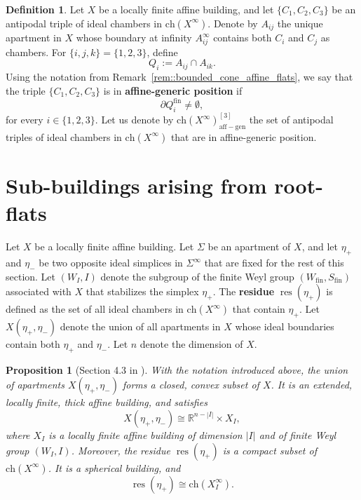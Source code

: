 \documentclass[11pt]{amsart}
\newcommand{\affgen}{\Ch(X^\infty)_{\mathrm{aff-gen}}^{[3]}}
\newcommand{\Ch}{\mathrm{ch}}
\theoremstyle{plain}
\newtheorem{prop}[thm]{Proposition}
\theoremstyle{definition}
\newtheorem{Def}[thm]{Definition}
\theoremstyle{remark}
\begin{document}
	
	\begin{Def}
		\label{def::generic_position_1}
		Let \( X \) be a locally finite affine building, and let  \(\{C_1, C_2, C_3\}\)
		be an antipodal triple of ideal chambers in  $\Ch(X^\infty)$. Denote by \( A_{ij} \) the unique apartment in \( X \) whose boundary at infinity \( A_{ij}^{\infty} \) contains both \( C_i \) and \( C_j \) as chambers. For \(\{i,j,k\}=\{1,2,3\}\), define
		\[
		Q_i := A_{ij} \cap A_{ik}.
		\]
		Using the notation from Remark~\ref{rem::bounded_cone_affine_flats}, we say that the triple $\{C_1, C_2, C_3\}$ is in \textbf{affine-generic position} if 
		\[
		\partial Q_i^{\mathrm{fin}} \neq \emptyset,
		\]
		for every $i \in \{1,2,3\}$.
		Let us denote by $\affgen$ the set of antipodal triples of ideal chambers in $\Ch(X^\infty)$ that are in affine-generic position.
	\end{Def}
	
	
	
	
	\section{Sub-buildings arising from root-flats}
	\label{sec::sub_buildings_affine_flats}
	
	Let \( X \) be a locally finite affine building. Let \( \Sigma \) be an apartment of \( X \), and let \( \eta_{+} \) and \( \eta_{-} \) be two opposite ideal simplices in \( \Sigma^\infty \) that are fixed for the rest of this section. Let \( (W_I, I) \) denote the subgroup of the finite Weyl group \( (W_{\mathrm{fin}}, S_{\mathrm{fin}}) \) associated with \( X \) that stabilizes the simplex \( \eta_{+} \). The \textbf{residue} \( \operatorname{res}(\eta_{+}) \) is defined as the set of all ideal chambers in \( \Ch(X^\infty) \) that contain \( \eta_{+} \). Let \( X(\eta_{+}, \eta_{-}) \) denote the union of all apartments in \( X \) whose ideal boundaries contain both \( \eta_{+} \) and \( \eta_{-} \). Let \( n \) denote the dimension of \( X \).
	
	\begin{prop}[Section 4.3 in \cite{Rousseau2011}]
		\label{prop::res_building}
		With the notation introduced above, the union of apartments \( X(\eta_{+}, \eta_{-}) \) forms a closed, convex subset of \( X \). It is an extended, locally finite, thick affine building, and satisfies
		\[
		X(\eta_{+}, \eta_{-}) \cong \mathbb{R}^{n - |I|} \times X_I,
		\]
		where \( X_I \) is a locally finite affine building of dimension \( |I| \) and of finite Weyl group $(W_I,I)$. Moreover, the residue \( \operatorname{res}(\eta_{+}) \) is a compact subset of \( \Ch(X^\infty) \). It is a spherical building, and
		\[
		\operatorname{res}(\eta_{+}) \cong \Ch(X_I^\infty).
		\]
	\end{prop}
	
\end{document}
